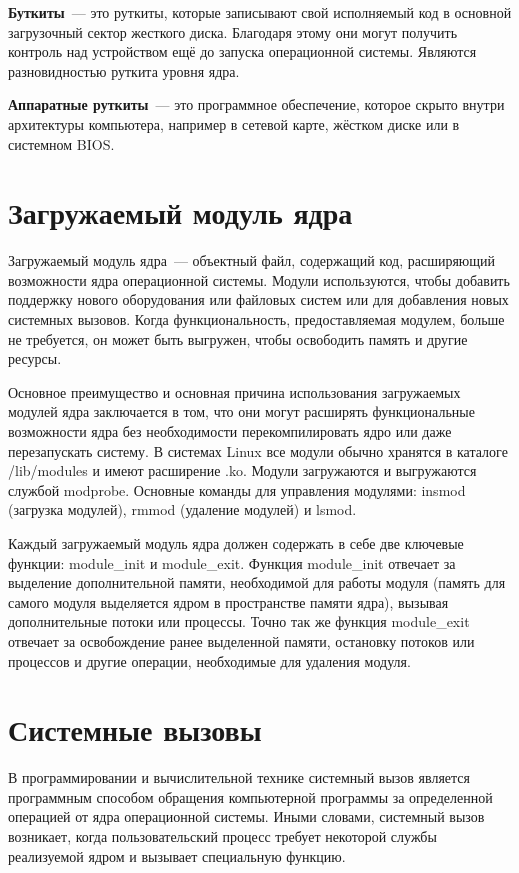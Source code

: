 \textbf{Буткиты}~--- это руткиты, которые записывают свой исполняемый код в основной загрузочный сектор жесткого диска. Благодаря этому они могут получить контроль над устройством ещё до запуска операционной системы. Являются разновидностью руткита уровня ядра.

\textbf{Аппаратные руткиты}~--- это программное обеспечение, которое скрыто внутри архитектуры компьютера, например в сетевой карте, жёстком диске или в системном BIOS.

\section{Загружаемый модуль ядра}%
\label{sec:zagruzhaemyi_modul_iadra}

Загружаемый модуль ядра~--- объектный файл, содержащий код, расширяющий возможности ядра операционной системы. Модули используются, чтобы добавить поддержку нового оборудования или файловых систем или для добавления новых системных вызовов. Когда функциональность, предоставляемая модулем, больше не требуется, он может быть выгружен, чтобы освободить память и другие ресурсы.

Основное преимущество и основная причина использования загружаемых модулей ядра заключается в том, что они могут расширять функциональные возможности ядра без необходимости перекомпилировать ядро или даже перезапускать систему. В системах Linux все модули обычно хранятся в каталоге /lib/modules и имеют расширение .ko. Модули загружаются и выгружаются службой modprobe. Основные команды для управления модулями: insmod (загрузка модулей), rmmod (удаление модулей) и lsmod.

Каждый загружаемый модуль ядра должен содержать в себе две ключевые функции: module\_init и module\_exit. Функция module\_init отвечает за выделение дополнительной памяти, необходимой для работы модуля (память для самого модуля выделяется ядром в пространстве памяти ядра), вызывая дополнительные потоки или процессы. Точно так же функция module\_exit отвечает за освобождение ранее выделенной памяти, остановку потоков или процессов и другие операции, необходимые для удаления модуля.

\section{Системные вызовы}%
\label{sec:sistemnye_vyzovy}

В программировании и вычислительной технике системный вызов является программным способом обращения компьютерной программы за определенной операцией от ядра операционной системы. Иными словами, системный вызов возникает, когда пользовательский процесс требует некоторой службы реализуемой ядром и вызывает специальную функцию.

